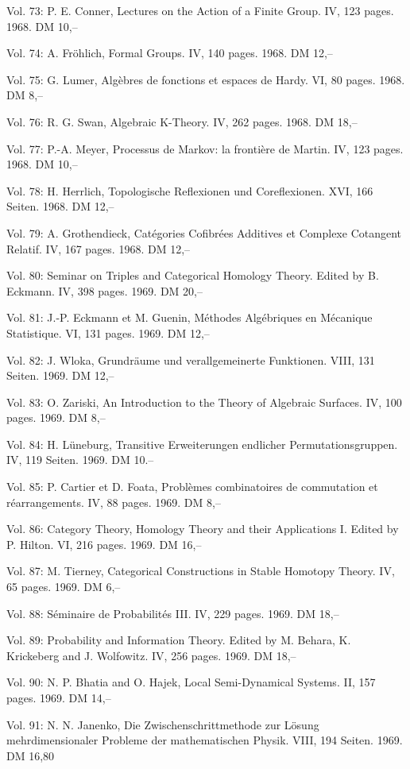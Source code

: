 Vol. 73: P. E. Conner, Lectures on the Action of a Finite Group. IV, 123 pages. 1968. DM 10,--

Vol. 74: A. Fröhlich, Formal Groups. IV, 140 pages. 1968. DM 12,--

Vol. 75: G. Lumer, Algèbres de fonctions et espaces de Hardy. VI, 80 pages. 1968. DM 8,--

Vol. 76: R. G. Swan, Algebraic K-Theory. IV, 262 pages. 1968. DM 18,--

Vol. 77: P.-A. Meyer, Processus de Markov: la frontière de Martin. IV, 123 pages. 1968. DM 10,--

Vol. 78: H. Herrlich, Topologische Reflexionen und Coreflexionen. XVI, 166 Seiten. 1968. DM 12,--

Vol. 79: A. Grothendieck, Catégories Cofibrées Additives et Complexe Cotangent Relatif. IV, 167 pages. 1968. DM 12,--

Vol. 80: Seminar on Triples and Categorical Homology Theory. Edited by B. Eckmann. IV, 398 pages. 1969. DM 20,--

Vol. 81: J.-P. Eckmann et M. Guenin, Méthodes Algébriques en Mécanique Statistique. VI, 131 pages. 1969. DM 12,--

Vol. 82: J. Wloka, Grundräume und verallgemeinerte Funktionen. VIII, 131 Seiten. 1969. DM 12,--

Vol. 83: O. Zariski, An Introduction to the Theory of Algebraic Surfaces. IV, 100 pages. 1969. DM 8,--

Vol. 84: H. Lüneburg, Transitive Erweiterungen endlicher Permutationsgruppen. IV, 119 Seiten. 1969. DM 10.--

Vol. 85: P. Cartier et D. Foata, Problèmes combinatoires de commutation et réarrangements. IV, 88 pages. 1969. DM 8,--

Vol. 86: Category Theory, Homology Theory and their Applications I. Edited by P. Hilton. VI, 216 pages. 1969. DM 16,--

Vol. 87: M. Tierney, Categorical Constructions in Stable Homotopy Theory. IV, 65 pages. 1969. DM 6,--

Vol. 88: Séminaire de Probabilités III. IV, 229 pages. 1969. DM 18,--

Vol. 89: Probability and Information Theory. Edited by M. Behara, K. Krickeberg and J. Wolfowitz. IV, 256 pages. 1969. DM 18,--

Vol. 90: N. P. Bhatia and O. Hajek, Local Semi-Dynamical Systems. II, 157 pages. 1969. DM 14,--

Vol. 91: N. N. Janenko, Die Zwischenschrittmethode zur Lösung mehrdimensionaler Probleme der mathematischen Physik. VIII, 194 Seiten. 1969. DM 16,80

